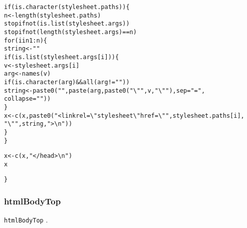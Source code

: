 \documentclass{article}\usepackage[]{graphicx}\usepackage[]{color}
\makeatletter
\newcommand{\hlnum}[1]{\textcolor[rgb]{0.863,0.196,0.184}{#1}}%
\newcommand{\hlstr}[1]{\textcolor[rgb]{0.863,0.196,0.184}{#1}}%
\newcommand{\hlopt}[1]{\textcolor[rgb]{0.576,0.631,0.631}{#1}}%
\newcommand{\hlstd}[1]{\textcolor[rgb]{0.514,0.58,0.588}{#1}}%
\newcommand{\hlkwa}[1]{\textcolor[rgb]{0.796,0.294,0.086}{#1}}%
\newcommand{\hlkwb}[1]{\textcolor[rgb]{0.522,0.6,0}{#1}}%
\newcommand{\hlkwc}[1]{\textcolor[rgb]{0.796,0.294,0.086}{#1}}%
\newcommand{\hlkwd}[1]{\textcolor[rgb]{0.576,0.631,0.631}{#1}}%
\newenvironment{kframe}{%
 \def\at@end@of@kframe{}%
 \ifinner\ifhmode%
  \def\at@end@of@kframe{\end{minipage}}%
  \begin{minipage}{\columnwidth}%
 \fi\fi%
 \def\FrameCommand##1{\hskip\@totalleftmargin \hskip-\fboxsep
 \colorbox{shadecolor}{##1}\hskip-\fboxsep
     \hskip-\linewidth \hskip-\@totalleftmargin \hskip\columnwidth}%
 \MakeFramed {\advance\hsize-\width
   \@totalleftmargin\z@ \linewidth\hsize
   \@setminipage}}%
 {\par\unskip\endMakeFramed%
 \at@end@of@kframe}
\newenvironment{knitrout}{}{} %
\makeatother
\begin{document}
\begin{knitrout}
\begin{kframe}
\begin{alltt}
    \hlkwa{if} \hlstd{(}\hlkwd{is.character}\hlstd{(stylesheet.paths)) \{}
        \hlstd{n} \hlkwb{<-} \hlkwd{length}\hlstd{(stylesheet.paths)}
        \hlkwd{stopifnot}\hlstd{(}\hlkwd{is.list}\hlstd{(stylesheet.args))}
        \hlkwd{stopifnot}\hlstd{(}\hlkwd{length}\hlstd{(stylesheet.args)} \hlopt{==} \hlstd{n)}
        \hlkwa{for} \hlstd{(i} \hlkwa{in} \hlnum{1}\hlopt{:}\hlstd{n) \{}
            \hlstd{string} \hlkwb{<-} \hlstr{""}
            \hlkwa{if} \hlstd{(}\hlkwd{is.list}\hlstd{(stylesheet.args[i])) \{}
                \hlstd{v} \hlkwb{<-} \hlstd{stylesheet.args[i]}
                \hlstd{arg} \hlkwb{<-} \hlkwd{names}\hlstd{(v)}
                \hlkwa{if} \hlstd{(}\hlkwd{is.character}\hlstd{(arg)} \hlopt{&&} \hlkwd{all}\hlstd{(arg} \hlopt{!=} \hlstr{""}\hlstd{))}
                  \hlstd{string} \hlkwb{<-} \hlkwd{paste0}\hlstd{(}\hlstr{" "}\hlstd{,} \hlkwd{paste}\hlstd{(arg,} \hlkwd{paste0}\hlstd{(}\hlstr{"\textbackslash{}""}\hlstd{, v,} \hlstr{"\textbackslash{}""}\hlstd{),} \hlkwc{sep} \hlstd{=} \hlstr{"="}\hlstd{,}
                    \hlkwc{collapse} \hlstd{=} \hlstr{" "}\hlstd{))}
            \hlstd{\}}
            \hlstd{x} \hlkwb{<-} \hlkwd{c}\hlstd{(x,} \hlkwd{paste0}\hlstd{(}\hlstr{"<link rel=\textbackslash{}"stylesheet\textbackslash{}" href=\textbackslash{}""}\hlstd{, stylesheet.paths[i],}
                \hlstr{"\textbackslash{}""}\hlstd{, string,} \hlstr{">\textbackslash{}n"}\hlstd{))}
        \hlstd{\}}
    \hlstd{\}}

    \hlstd{x} \hlkwb{<-} \hlkwd{c}\hlstd{(x,} \hlstr{"</head>\textbackslash{}n"}\hlstd{)}
    \hlstd{x}

\hlstd{\}}
\end{alltt}
\end{kframe}
\end{knitrout}

\subsubsection{htmlBodyTop}

\texttt{htmlBodyTop} .
\end{document}
